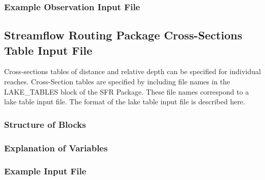 \vspace{5mm}
\subsubsection{Example Observation Input File}


\newpage
\subsection{Streamflow Routing Package Cross-Sections Table Input File}
Cross-sections tables of distance and relative depth can be specified for individual reaches.  Cross-Section tables are specified by including file names in the LAKE\_TABLES block of the SFR Package.  These file names correspond to a lake table input file.  The format of the lake table input file is described here.

\vspace{5mm}
\subsubsection{Structure of Blocks}
\vspace{5mm}



\vspace{5mm}

\vspace{5mm}
\subsubsection{Explanation of Variables}
\begin{description}

\end{description}

\subsubsection{Example Input File}
%

